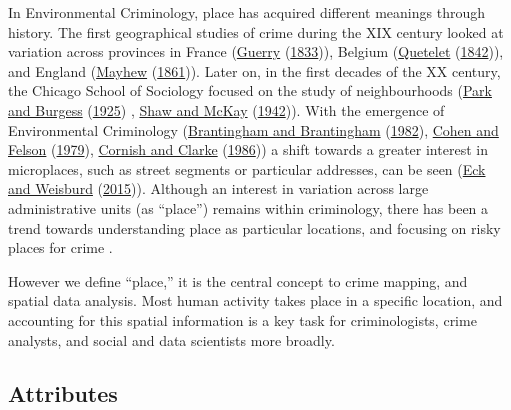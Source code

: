 \documentclass[
]{book}
\begin{document}
In Environmental Criminology, place has acquired different meanings through history. The first geographical studies of crime during the XIX century looked at variation across provinces in France (\protect\hyperlink{ref-Guerry_1833}{Guerry} (\protect\hyperlink{ref-Guerry_1833}{1833})), Belgium (\protect\hyperlink{ref-Quetelet_1842}{Quetelet} (\protect\hyperlink{ref-Quetelet_1842}{1842})), and England (\protect\hyperlink{ref-Mayhew_1861}{Mayhew} (\protect\hyperlink{ref-Mayhew_1861}{1861})). Later on, in the first decades of the XX century, the Chicago School of Sociology focused on the study of neighbourhoods (\protect\hyperlink{ref-Park_1925}{Park and Burgess} (\protect\hyperlink{ref-Park_1925}{1925}) , \protect\hyperlink{ref-Shaw_1942}{Shaw and McKay} (\protect\hyperlink{ref-Shaw_1942}{1942})). With the emergence of Environmental Criminology (\protect\hyperlink{ref-Brantingham_1982}{Brantingham and Brantingham} (\protect\hyperlink{ref-Brantingham_1982}{1982}), \protect\hyperlink{ref-Cohen_1979}{Cohen and Felson} (\protect\hyperlink{ref-Cohen_1979}{1979}), \protect\hyperlink{ref-Cornish_1986}{Cornish and Clarke} (\protect\hyperlink{ref-Cornish_1986}{1986})) a shift towards a greater interest in microplaces, such as street segments or particular addresses, can be seen (\protect\hyperlink{ref-Eck_2015}{Eck and Weisburd} (\protect\hyperlink{ref-Eck_2015}{2015})). Although an interest in variation across large administrative units (as ``place'') remains within criminology, there has been a trend towards understanding place as particular locations, and focusing on risky places for crime .

However we define ``place,'' it is the central concept to crime mapping, and spatial data analysis. Most human activity takes place in a specific location, and accounting for this spatial information is a key task for criminologists, crime analysts, and social and data scientists more broadly.

\hypertarget{attributes}{%
\subsection{Attributes}\label{attributes}}
\end{document}
